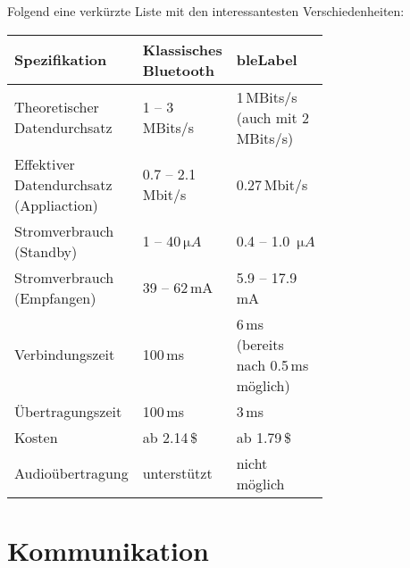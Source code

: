 Folgend eine verkürzte Liste mit den interessantesten Verschiedenheiten:
\begin{table}[H]
	\small\sffamily\renewcommand{\arraystretch}{1.4}
	\begin{tabular}{p{0.35\linewidth}lp{0.35\linewidth}}
		\toprule
		Spezifikation & Klassisches Bluetooth & \gls{bleLabel}\\
		\midrule
		Theoretischer Datendurchsatz & 1 -- 3\,MBits/s & 1\,MBits/s (auch mit 2\,MBits/s)\\
		Effektiver Datendurchsatz (Appliaction) & 0.7 -- 2.1\,Mbit/s	& 0.27\,Mbit/s\\
		
		Stromverbrauch (Standby) & 1 -- 40\,$\si{\micro A}$ &  0.4 -- 1.0 \,$\si{\micro A}$ \\
		Stromverbrauch (Empfangen) & 39 -- 62\,mA &  5.9 -- 17.9\,mA \\
		
		Verbindungszeit & 100\,ms & 6\,ms (bereits nach 0.5\,ms möglich)\\
		Übertragungszeit & 100\,ms & 3\,ms\\
		Kosten & ab 2.14\,\$ & ab 1.79\,\$ \\
		Audioübertragung & unterstützt & nicht möglich\\
		\bottomrule
	\end{tabular}
\end{table}


\section{Kommunikation}

